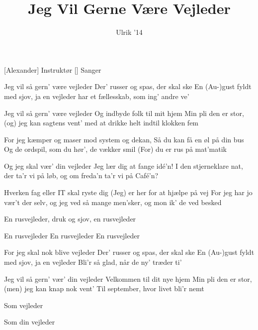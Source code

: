 \documentclass[a4paper,11pt]{article}
\title{Jeg Vil Gerne Være Vejleder}
\author{Ulrik '14}
\begin{document}
\maketitle

\begin{roles}
[Alexander] Instruktør
[] Sanger
\end{roles}

\begin{song}
 Jeg vil så gern' være vejleder
Der' russer og spas, der skal ske
En (Au-)gust fyldt med sjov, ja en vejleder
har et fællesskab, som ing' andre ve'

 Jeg vil så gern' være vejleder
Og indbyde folk til mit hjem
Min pli den er stor, (og) jeg kan sagtens vent'
med at drikke helt indtil klokken fem

 For jeg kæmper og maser mod system og dekan,
Så du kan få en øl på din bus
Og de ordspil, som du hør', de vækker smil
(For) du er rus på mat'matik

 Og jeg skal vær' din vejleder
Jeg lær dig at fange idé'n!
I den stjerneklare nat, der ta'r vi på løb,
og om freda'n ta'r vi på Café'n?

 Hverken fag eller IT skal ryste dig
(Jeg) er her for at hjælpe på vej
For jeg har jo vær't der selv, og jeg ved så mange men'sker,
og mon ik' de ved besked

 En rusvejleder,
druk og sjov,
en rusvejleder

 En rusvejleder
En rusvejleder
En rusvejleder

 For jeg skal nok blive vejleder
Der' russer og spas, der skal ske
En (Au-)gust fyldt med sjov, ja en vejleder
Bli’r så glad, når de ny’ træder ti’

 Jeg vil så gern' vær’ din vejleder
Velkommen til dit nye hjem
Min pli den er stor, (men) jeg kan knap nok vent'
Til september, hvor livet bli’r nemt

 Som vejleder

 Som din vejleder




\end{song}
\end{document}
